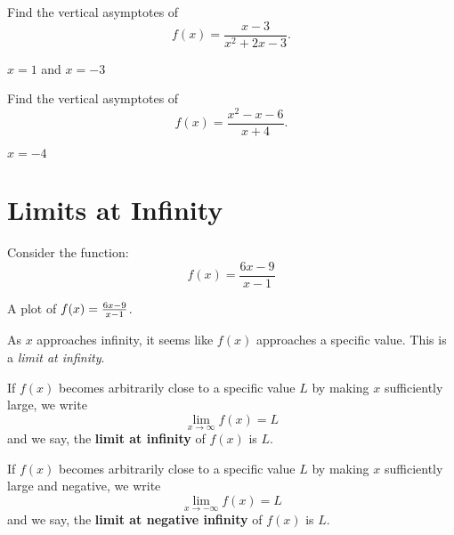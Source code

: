 \begin{exercises}
\endtwocol


\begin{exercise}
Find the vertical asymptotes of
\[
f(x) = \frac{x-3}{x^2+2x-3}.
\]
\begin{answer}
  $x = 1$ and $x = -3$
\end{answer}
\end{exercise}


\begin{exercise}
Find the vertical asymptotes of
\[
f(x) = \frac{x^2-x-6}{x+4}.
\]
\begin{answer}
  $x = -4$
\end{answer}
\end{exercise}
\end{exercises}






\section{Limits at Infinity}


Consider the function:
\[
f(x) = \frac{6x-9}{x-1}
\]
\begin{marginfigure}[0in]
\caption{A plot of $f(x)=\protect\frac{6x-9}{x-1}$.}
\label{plot:(6x-9)/(x-1)}
\end{marginfigure}
As $x$ approaches infinity, it seems like $f(x)$ approaches a specific
value. This is a \textit{limit at infinity}.

\begin{definition}\label{def:limitAtInfty}
If $f(x)$ becomes arbitrarily close to a specific value $L$ by making
$x$ sufficiently large, we write
\[
\lim_{x\to \infty} f(x) = L
\]
and we say, the \textbf{limit at infinity} of $f(x)$ is $L$.  

If $f(x)$ becomes
arbitrarily close to a specific value $L$ by making $x$ sufficiently
large and negative, we write
\[
\lim_{x\to -\infty} f(x) = L
\]
and we say, the \textbf{limit at negative infinity} of $f(x)$ is $L$.  
\end{definition}

